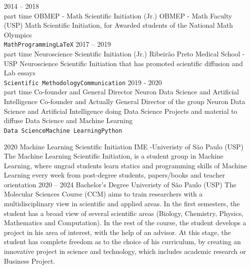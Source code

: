 \documentclass[9pt]{developercv} %
\begin{document}
\begin{center}
\end{center}



\begin{entrylist}
	\entry
		{2014 -- 2018\\\footnotesize{part time}}
		{OBMEP - Math Scientific Initiation (Jr.)}
		{OBMEP - Math Faculty (USP)}
		{Math Scientific Initiation, for Awarded students of the National Math Olympics\\ \texttt{Math}\slashsep\texttt{Programming}\slashsep\texttt{\LaTeX}}
	\entry
		{2017 -- 2019\\\footnotesize{part time}}
		{Neuroscience Scientific Initiation (Jr.)}
		{Ribeirão Preto Medical School - USP}
		{Neuroscience Scientific Initiation that has promoted scientific diffusion and Lab essays \\ \texttt{Scientific Methodology}\slashsep\texttt{Communication}}
	\entry
		{2019 - 2020\\\footnotesize{part time}}
		{Co-founder and General Director}
		{Neuron Data Science and Artificial Intelligence }
		{Co-founder and Actually General Director of the group Neuron Data Science and Artificial Intelligence doing Data Science Projects and material to diffuse Data Science and Machine Learning \\ \texttt{Data Science}\slashsep\texttt{Machine Learning}\slashsep\texttt{Python}}
\end{entrylist}



\begin{entrylist}
	\entry
		{2020}
		{Machine Learning Scientific Initiation}
		{IME -Univeristy of São Paulo (USP)}
		{The Machine Learning Scientific Initiation, is a student group in Machine Learning, where ungrad students learn statics and programming skills of Machine Learning every week from post-degree students, papers/books and teacher orientation }
	\entry
		{2020 -- 2024}
		{Bachelor's Degree}
		{Univeristy of São Paulo (USP)}
		{The Molecular Sciences Course (CCM) aims to train researchers with a multidisciplinary view in scientific and applied areas. In the first semesters, the student has a broad view of several scientific areas (Biology, Chemistry, Physics, Mathematics and Computation). In the rest of the course, the student develops a project in his area of interest, with the help of an advisor. At this stage, the student has complete freedom as to the choice of his curriculum, by creating an innovative project in science and technology, which includes academic research or Business Project.}
\end{entrylist}
\end{document}
